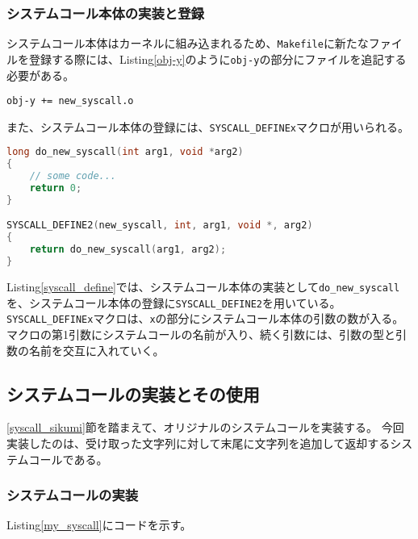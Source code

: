 \documentclass[main]{subfiles}
\begin{document}
\subsubsection{システムコール本体の実装と登録}

システムコール本体はカーネルに組み込まれるため、\texttt{Makefile}に新たなファイルを登録する際には、Listing\ref{obj-y}のように\texttt{obj-y}の部分にファイルを追記する必要がある。

\begin{lstlisting}[label=obj-y,caption=システムコールの実装を記述したファイルのMakefileへの追記]
obj-y += new_syscall.o
\end{lstlisting}

また、システムコール本体の登録には、\texttt{SYSCALL\_DEFINEx}マクロが用いられる。

\begin{lstlisting}[label=syscall_define,caption=システムコール登録に用いるマクロ,language=c]
long do_new_syscall(int arg1, void *arg2)
{
    // some code...
    return 0;
}

SYSCALL_DEFINE2(new_syscall, int, arg1, void *, arg2)
{
    return do_new_syscall(arg1, arg2);
}
\end{lstlisting}

Listing\ref{syscall_define}では、システムコール本体の実装として\texttt{do\_new\_syscall}を、システムコール本体の登録に\texttt{SYSCALL\_DEFINE2}を用いている。
\texttt{SYSCALL\_DEFINEx}マクロは、\texttt{x}の部分にシステムコール本体の引数の数が入る。
マクロの第1引数にシステムコールの名前が入り、続く引数には、引数の型と引数の名前を交互に入れていく。

\subsection{システムコールの実装とその使用}

\ref{syscall_sikumi}節を踏まえて、オリジナルのシステムコールを実装する。
今回実装したのは、受け取った文字列に対して末尾に文字列を追加して返却するシステムコールである。

\subsubsection{システムコールの実装}

Listing\ref{my_syscall}にコードを示す。


\end{document}
